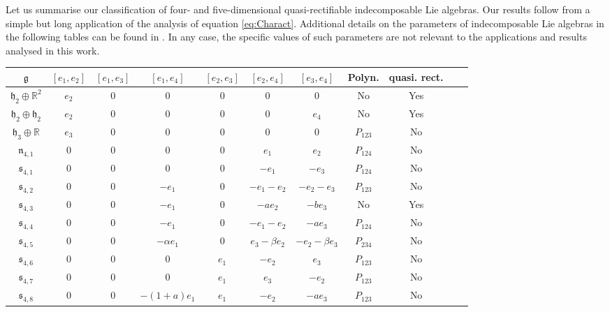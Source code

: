 \documentclass[12pt]{article}
\theoremstyle{plain}
\theoremstyle{definition}
\numberwithin{equation}{section}
\begin{document}
Let us summarise our classification of four- and five-dimensional quasi-rectifiable indecomposable Lie algebras. Our results follow from a simple but long application of the analysis of equation \eqref{eq:Charact}. Additional details on the parameters of indecomposable Lie algebras in the following tables can be found in \cite{WS14}. In any case, the specific values of such parameters are not relevant to the applications and results analysed in this work.
{\small 
\begin{table}[ht]
   \centering
    \begin{tabular}{|c|c|c|c|c|c|c|c|c|c|c|}
        \hline
         $\mathfrak{g}$& $[e_1,e_2]$ & $[e_1,e_3]$ & $[e_1,e_4]$ & $[e_2,e_3]$&$[e_2,e_4]$&$[e_3,e_4]$& Polyn. & quasi.\!\!\! rect. \\
 \hline
        $\mathfrak{h}_2\oplus \mathbb{R}^2$ & $e_2$ & $0$ & $0$ & $0$ &$0$&$0$& No & Yes\\
 \hline
        $\mathfrak{h}_2\oplus \mathfrak{h}_2$ & $e_2$ & $0$ & $0$ & $0$ &$0$&$e_4$& No & Yes\\
        \hline
        $\mathfrak{h}_3\oplus \mathbb{R}$ & $e_3$ & $0$ & $0$ & $0$ &$0$&$0$&$P_{123}$& No\\\hline
        $\mathfrak{n}_{4,1}$ & $0$ & $0$ & $0$ & $0$ &$e_1$&$e_2$& $P_{124}$& No\\
        \hline
             $\mathfrak{s}_{4,1} $ & $0$ & $0$ & $0$ & $0$ &$-e_1$&$-e_3$&$P_{124}$& No\\
              \hline
             $\mathfrak{s}_{4,2} $ & $0$ & $0$ & $-e_1$ & $0$ &$-e_1-e_2$&$-e_2-e_3$& $P_{123}$&No\\
        \hline
             $\mathfrak{s}_{4,3} $ & $0$ & $0$ & $-e_1$ & $0$&$-ae_2$ &$-be_3$&No& Yes\\
             \hline
             $\mathfrak{s}_{4,4} $ & $0$ & $0$ & $-e_1$ & $0$ &$-e_1-e_2$&$-ae_3$&$P_{124}$& No\\
        \hline
             $\mathfrak{s}_{4,5} $ & $0$ & $0$ & $-\alpha e_1$ & $0$ &$e_3-\beta e_2$&$-e_2-\beta e_3$&$P_{234}$& No\\
                     \hline
             $\mathfrak{s}_{4,6} $ & $0$ & $0$ & $0$ & $e_1$ &$-e_2$&$e_3$&$P_{123}$& No\\
                     \hline
             $\mathfrak{s}_{4,7} $ & $0$ & $0$ & $0$ & $e_1$ &$e_3$&$-e_2$&$P_{123}$& No\\
                     \hline
             $\mathfrak{s}_{4,8} $ & $0$ & $0$ & $-(1+a)e_1$ & $e_1$ &$ -e_2$&$-ae_3$&$P_{123}$& No\\        \hline

\end{tabular}
\end{table}}
\end{document}
